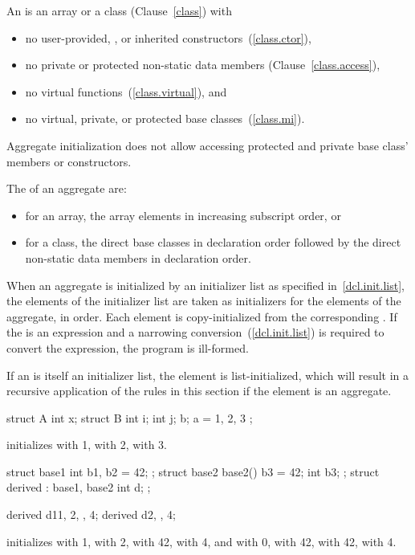 \pnum
An  is an array or a class (Clause~\ref{class}) with
\begin{itemize}
\item
no user-provided, , or inherited constructors~(\ref{class.ctor}),
\item
no private or protected non-static data members (Clause~\ref{class.access}),
\item
no virtual functions~(\ref{class.virtual}), and
\item
no virtual, private, or protected base classes~(\ref{class.mi}).
\end{itemize}
\begin{note}
Aggregate initialization does not allow accessing
protected and private base class' members or constructors.
\end{note}

\pnum
{}%
The  of an aggregate are:
\begin{itemize}
\item
for an array, the array elements in increasing subscript order, or
\item
for a class, the direct base classes in declaration order
followed by the direct non-static data members in declaration order.
\end{itemize}

\pnum
When an aggregate is initialized by an initializer list
as specified in~\ref{dcl.init.list},
the elements of the initializer list are taken as initializers
for the elements of the aggregate, in order.
Each element is copy-initialized
from the corresponding .
If the  is an expression and
a narrowing conversion~(\ref{dcl.init.list}) is required
to convert the expression, the program is ill-formed.
\begin{note} If an  is itself an initializer list,
the element is list-initialized, which will result in a recursive application
of the rules in this section if the element is an aggregate. \end{note}
\begin{example}
\begin{codeblock}
struct A {
  int x;
  struct B {
    int i;
    int j;
  } b;
} a = { 1, { 2, 3 } };
\end{codeblock}
initializes
with 1,
with 2,
with 3.

\begin{codeblock}
struct base1 { int b1, b2 = 42; };
struct base2 {
  base2() {
    b3 = 42;
  }
  int b3;
};
struct derived : base1, base2 {
  int d;
};

derived d1{{1, 2}, {}, 4};
derived d2{{}, {}, 4};
\end{codeblock}
initializes
 with 1,
 with 2,
 with 42,
 with 4, and
 with 0,
 with 42,
 with 42,
 with 4.
\end{example}


